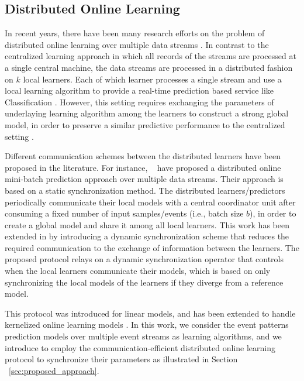 
\subsection{Distributed Online Learning}

\par In recent years, there have been many research efforts on the problem of distributed online learning over multiple data streams \cite{tekin2014distributed,yan2013distributed,canzian2015ensemble,zhang2014fast,dekel2012optimal,kamp2014communication}.   In contrast to the centralized learning approach in which all records of the streams are processed at a single central machine, the data streams are processed in a distributed fashion on $k$ local learners. Each of which learner processes a single stream and use a local learning algorithm to provide a real-time prediction based service like Classification \cite{canzian2015ensemble}.  However, this setting requires exchanging the parameters of underlaying learning algorithm among the learners to construct a strong global model, in order to preserve a similar predictive performance to the centralized setting \cite{kamp2014communication}. 

\par Different communication schemes between the distributed learners have been proposed in the literature. For instance, ~\citet{dekel2012optimal} have proposed a distributed online mini-batch prediction approach over multiple data streams. Their approach is based on a static synchronization method. The distributed learners/predictors periodically communicate  their local models with a central coordinator unit after consuming a fixed number of input samples/events (i.e., batch size $b$), in order to  create a global model  and share it among all local learners. This work has been extended in \cite{kamp2014communication} by introducing a dynamic synchronization scheme that reduces the required communication to the exchange of information between the learners. The proposed protocol relays on a dynamic synchronization operator that controls when the local learners communicate their models, which is based on only synchronizing the local models of the learners if they diverge from a reference model. 
 
\par This protocol was introduced for linear models, and has been extended to handle kernelized online learning models \cite{kamp2016communication}. In this work, we consider the event patterns prediction models over multiple event streams as learning algorithms, and we introduce to employ the communication-efficient distributed online learning protocol \cite{kamp2014communication} to synchronize their parameters as illustrated in Section ~\ref{sec:proposed_approach}. 
